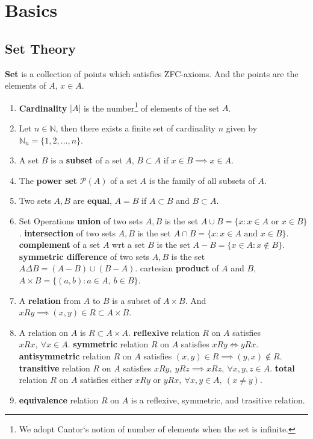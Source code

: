 \chapter{Basics}
\section{Set Theory}
\textbf{Set} is a collection of points which satisfies ZFC-axioms.
And the points are the elements of $A$, $x \in A$.

\begin{enumerate}
	\item \textbf{Cardinality} $|A|$ is the number\footnote{We adopt Cantor`s notion of number of elements when the set is infinite.} of elements of the set $A$.
	\item Let $n \in \mathbb{N}$, then there exists a finite set of cardinality $n$ given by $\mathbb{N}_n = \{ 1,2,\dots, n \}$.
	\item A set $B$ is a \textbf{subset} of a set $A$, $B \subset A$ if $x \in B \implies x \in A$.
	\item The \textbf{power set} $\mathcal{P}(A)$ of a set $A$ is the family of all subsets of $A$.
	\item Two sets $A,B$ are \textbf{equal}, $A = B$ if $A \subset B$ and $B \subset A$.
	\item Set Operations
		\subitem \textbf{union} of two sets $A,B$ is the set $A \cup B = \{ x : x \in A \text{ or } x \in B\}$.
		\subitem \textbf{intersection} of two sets $A,B$ is the set $A \cap B = \{ x : x \in A \text{ and } x \in B\}$.
		\subitem \textbf{complement} of a set $A$ wrt a set $B$ is the set $A-B = \{ x \in A : x \notin B\}$.
		\subitem \textbf{symmetric difference} of two sets $A,B$ is the set $A \Delta B = (A-B) \cup (B-A)$.
		\subitem cartesian \textbf{product} of $A$ and $B$, $A \times B = \{ (a,b) : a \in A,\ b \in B\}$.
	\item A \textbf{relation} from $A$ to $B$ is a subset of $A \times B$.
	And $xRy \implies (x,y) \in R \subset A \times B$.
	\item A relation on $A$ is $R \subset A \times A$.
		\subitem \textbf{reflexive} relation $R$ on $A$ satisfies $xRx,\ \forall x \in A$.
		\subitem \textbf{symmetric} relation $R$ on $A$ satisfies $xRy \iff yRx$.
		\subitem \textbf{antisymmetric} relation $R$ on $A$ satisfies $(x,y) \in R \implies (y,x) \notin R$.
		\subitem \textbf{transitive} relation $R$ on $A$ satisfies $xRy,\ yRz \implies xRz,\ \forall x,y,z \in A$.
		\subitem \textbf{total} relation $R$ on $A$ satisfies either $xRy \text{ or } yRx,\ \forall x,y \in A,\ (x \ne y)$.  \item \textbf{equivalence} relation $R$ on $A$ is a reflexive, symmetric, and trasitive relation.

\end{enumerate}
